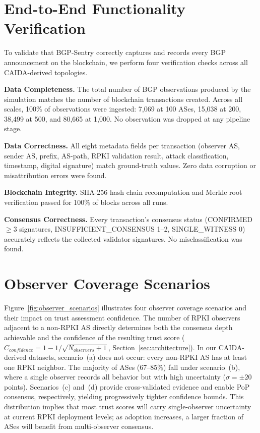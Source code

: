 \section{End-to-End Functionality Verification}
\label{app:functionality_testing}

To validate that BGP-Sentry correctly captures and records every BGP announcement on the blockchain, we perform four verification checks across all CAIDA-derived topologies.

\textbf{Data Completeness.} The total number of BGP observations produced by the simulation matches the number of blockchain transactions created. Across all scales, 100\% of observations were ingested: 7,069 at 100 ASes, 15,038 at 200, 38,499 at 500, and 80,665 at 1{,}000. No observation was dropped at any pipeline stage.

\textbf{Data Correctness.} All eight metadata fields per transaction (observer AS, sender AS, prefix, AS-path, RPKI validation result, attack classification, timestamp, digital signature) match ground-truth values. Zero data corruption or misattribution errors were found.

\textbf{Blockchain Integrity.} SHA-256 hash chain recomputation and Merkle root verification passed for 100\% of blocks across all runs.

\textbf{Consensus Correctness.} Every transaction's consensus status (CONFIRMED $\geq$3 signatures, INSUFFICIENT\_CONSENSUS 1--2, SINGLE\_WITNESS 0) accurately reflects the collected validator signatures. No misclassification was found.

\section{Observer Coverage Scenarios}
\label{app:observer_scenarios}

Figure~\ref{fig:observer_scenarios} illustrates four observer coverage scenarios and their impact on trust assessment confidence. The number of RPKI observers adjacent to a non-RPKI AS directly determines both the consensus depth achievable and the confidence of the resulting trust score ($C_{confidence} = 1 - 1/\sqrt{N_{observers} + 1}$, Section~\ref{sec:architecture}). In our CAIDA-derived datasets, scenario~(a) does not occur: every non-RPKI AS has at least one RPKI neighbor. The majority of ASes (67--85\%) fall under scenario~(b), where a single observer records all behavior but with high uncertainty ($\sigma{=}\pm 20$ points). Scenarios~(c) and~(d) provide cross-validated evidence and enable PoP consensus, respectively, yielding progressively tighter confidence bounds. This distribution implies that most trust scores will carry single-observer uncertainty at current RPKI deployment levels; as adoption increases, a larger fraction of ASes will benefit from multi-observer consensus.





